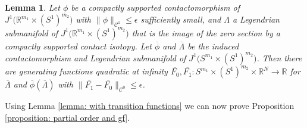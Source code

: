 \documentclass{amsart}
\newtheorem{lemma}[thm]{Lemma}
\theoremstyle{remark}
\begin{document}
\begin{lemma}\label{lemma: with transition functions small}
Let $\phi$ be a compactly supported contactomorphism
of $J^1 \big( \mathbb{R}^{m_1} \times (S^1)^{m_2} \big)$
with $\lVert \phi \rVert_{\mathcal{C}^1} \leq \epsilon$
sufficiently small,
and $\Lambda$ a Legendrian submanifold
of $J^1 \big( \mathbb{R}^{m_1} \times (S^1)^{m_2} \big)$
that is the image of the zero section
by a compactly supported contact isotopy.
Let $\overline{\phi}$ and $\overline{\Lambda}$
be the induced contactomorphism and Legendrian submanifold
of $J^1 \big( S^{m_1} \times (S^1)^{m_2} \big)$.
Then there are generating functions quadratic at infinity
$\overline{F_0}, \overline{F_1}:
S^{m_1} \times (S^1)^{m_2} \times \mathbb{R}^N \rightarrow \mathbb{R}$
for $\overline{\Lambda}$ and $\overline{\phi} (\overline{\Lambda})$
with $\lVert \overline{F_1} - \overline{F_0} \rVert_{\mathcal{C}^0} \leq \epsilon$.
\end{lemma}

Using Lemma \ref{lemma: with transition functions}
we can now prove Proposition \ref{proposition: partial order and gf}.
\end{document}
